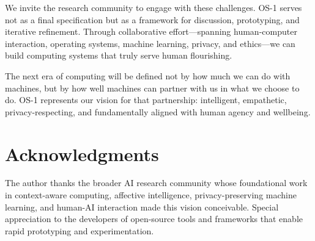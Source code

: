 \documentclass[conference]{IEEEtran}
\begin{document}
We invite the research community to engage with these challenges. OS-1 serves not as a final specification but as a framework for discussion, prototyping, and iterative refinement. Through collaborative effort—spanning human-computer interaction, operating systems, machine learning, privacy, and ethics—we can build computing systems that truly serve human flourishing.

The next era of computing will be defined not by how much we can do with machines, but by how well machines can partner with us in what we choose to do. OS-1 represents our vision for that partnership: intelligent, empathetic, privacy-respecting, and fundamentally aligned with human agency and wellbeing.

\section*{Acknowledgments}

The author thanks the broader AI research community whose foundational work in context-aware computing, affective intelligence, privacy-preserving machine learning, and human-AI interaction made this vision conceivable. Special appreciation to the developers of open-source tools and frameworks that enable rapid prototyping and experimentation.
\end{document}
